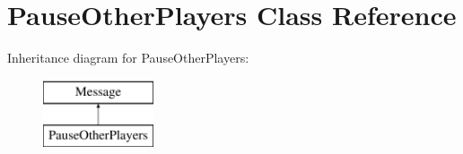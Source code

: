 \hypertarget{class_pause_other_players}{\section{Pause\-Other\-Players Class Reference}
\label{class_pause_other_players}
}
Inheritance diagram for Pause\-Other\-Players\-:\begin{figure}[H]
\begin{center}
\leavevmode
\includegraphics[height=2.000000cm]{class_pause_other_players}
\end{center}
\end{figure}
